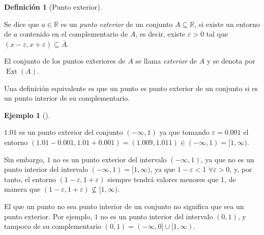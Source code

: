 \documentclass[
  a4paper,
]{scrreport}
\theoremstyle{definition}
\newtheorem{definition}{Definición}[chapter]
\theoremstyle{plain}
\theoremstyle{plain}
\theoremstyle{definition}
\theoremstyle{definition}
\newtheorem{example}{Ejemplo}[chapter]
\theoremstyle{plain}
\theoremstyle{remark}
\begin{document}
\begin{definition}[Punto
exterior]\protect\hypertarget{def-punto-exterior}{}\label{def-punto-exterior}

Se dice que \(a\in \mathbb{R}\) es un \emph{punto exterior} de un
conjunto \(A\subseteq \mathbb{R}\), si existe un entorno de \(a\)
contenido en el complementario de \(A\), es decir, existe
\(\varepsilon>0\) tal que
\((x-\varepsilon, x+\varepsilon) \subseteq \overline A\).

El conjunto de los puntos exteriores de \(A\) se llama \emph{exterior}
de \(A\) y se denota por \(\operatorname{Ext}(A)\).

\end{definition}

Una definición equivalente es que un punto es punto exterior de un
conjunto si es un punto interior de su complementario.

\begin{example}[]\protect\hypertarget{exm-punto-exterior}{}\label{exm-punto-exterior}

\(1.01\) es un punto exterior del conjunto \((-\infty, 1)\) ya que
tomando \(\varepsilon=0.001\) el entorno
\((1.01-0.001, 1.01+0.001)=(1.009, 1.011)\in \overline{(-\infty, 1)}=[1,\infty)\).

Sin embargo, \(1\) no es un punto exterior del intervalo
\((-\infty, 1)\), ya que no es un punto interior del intervalo
\(\overline{(-\infty, 1)}=[1,\infty)\), ya que \(1-\varepsilon < 1\)
\(\forall \varepsilon>0\), y, por tanto, el entorno
\((1-\varepsilon, 1+\varepsilon)\) siempre tendrá valores menores que 1,
de manera que
\((1-\varepsilon, 1+\varepsilon)\not \subseteq [1,\infty)\).

\end{example}

\begin{tcolorbox}[enhanced jigsaw, breakable, title=\textcolor{quarto-callout-warning-color}{\faExclamationTriangle}\hspace{0.5em}{Advertencia}, toprule=.15mm, coltitle=black, arc=.35mm, rightrule=.15mm, colframe=quarto-callout-warning-color-frame, colbacktitle=quarto-callout-warning-color!10!white, toptitle=1mm, titlerule=0mm, leftrule=.75mm, opacityback=0, colback=white, bottomrule=.15mm, bottomtitle=1mm, left=2mm, opacitybacktitle=0.6]

El que un punto no sea punto interior de un conjunto no significa que
sea un punto exterior. Por ejemplo, \(1\) no es un punto interior del
intervalo \((0,1)\), y tampoco de su complementario
\(\overline{(0,1)}=(-\infty, 0]\cup[1,\infty)\).

\end{tcolorbox}
\end{document}
